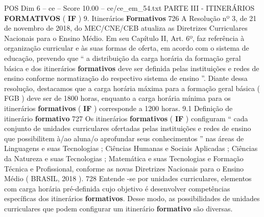 \begin{textsample}{POS Dim 6 – ce – Score 10.00 – ce/ce\_em\_54.txt}  \label{ex:f6_pos_035}
PARTE III - ITINERÁRIOS \textbf{FORMATIVOS} ( \textbf{IF} ) 9.
Itinerários \textbf{Formativos} 726 A Resolução nº 3, de 21 de novembro de 2018, do MEC/CNE/CEB atualiza as Diretrizes Curriculares Nacionais para o Ensino Médio.
Em seu Capítulo II, Art. 6º, faz referência à organização curricular e às suas formas de oferta, em acordo com o sistema de educação, prevendo que “ a distribuição da carga horária da formação geral básica e dos itinerários \textbf{formativos} deve ser definida pelas instituições e redes de ensino conforme normatização do respectivo sistema de ensino ”.
Diante dessa resolução, destacamos que a carga horária máxima para a formação geral básica ( FGB ) deve ser de 1800 horas, enquanto a carga horária mínima para os itinerários \textbf{formativos} ( \textbf{IF} ) corresponde a 1200 horas. 9.1 Definição de itinerário \textbf{formativo} 727 Os itinerários \textbf{formativos} ( \textbf{IF} ) configuram “ cada conjunto de unidades curriculares ofertadas pelas instituições e redes de ensino que possibilitem à/ao aluna/o aprofundar seus conhecimentos ” nas áreas de Linguagens e suas Tecnologias ; Ciências Humanas e Sociais Aplicadas ; Ciências da Natureza e suas Tecnologias ; Matemática e suas Tecnologias e Formação Técnica e Profissional, conforme as novas Diretrizes Nacionais para o Ensino Médio ( BRASIL, 2018 ). 728 Entende -se por unidades curriculares, elementos com carga horária pré-definida cujo objetivo é desenvolver competências específicas dos itinerários \textbf{formativos}.
Desse modo, as possibilidades de unidades curriculares que podem configurar um itinerário \textbf{formativo} são diversas.

\end{textsample}
